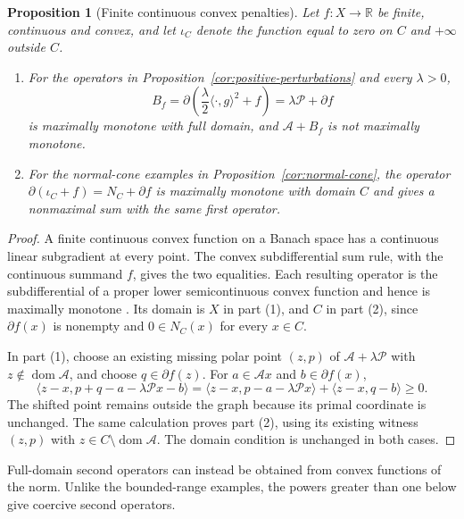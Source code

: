 \documentclass[11pt]{article}
\newcommand{\R}{\mathbb R}
\newcommand{\dom}{\operatorname{dom}}
\newcommand{\pair}[2]{\langle #1,#2\rangle}
\newtheorem{proposition}{Proposition}
\theoremstyle{definition}
\theoremstyle{remark}
\begin{document}
\begin{proposition}[Finite continuous convex penalties]
\label{cor:nonsmooth-penalties}
\label{cor:constrained-penalties}
Let $f:X\to\R$ be finite, continuous and convex, and let $\iota_C$ denote the function equal to zero on $C$ and $+\infty$ outside $C$.
\begin{enumerate}
\item For the operators in Proposition~\ref{cor:positive-perturbations} and every $\lambda>0$,
\[
B_f=\partial\left(\frac\lambda2\pair{\cdot}{g}^2+f\right)=\lambda\mathcal P+\partial f
\]
is maximally monotone with full domain, and $\mathcal A+B_f$ is not maximally monotone.
\item For the normal-cone examples in Proposition~\ref{cor:normal-cone}, the operator $\partial(\iota_C+f)=N_C+\partial f$ is maximally monotone with domain $C$ and gives a nonmaximal sum with the same first operator.
\end{enumerate}
\end{proposition}
\begin{proof}
A finite continuous convex function on a Banach space has a continuous linear subgradient at every point. The convex subdifferential sum rule, with the continuous summand $f$, gives the two equalities. Each resulting operator is the subdifferential of a proper lower semicontinuous convex function and hence is maximally monotone \cite{rockafellar1970subdiff}. Its domain is $X$ in part (1), and $C$ in part (2), since $\partial f(x)$ is nonempty and $0\in N_C(x)$ for every $x\in C$.

In part (1), choose an existing missing polar point $(z,p)$ of $\mathcal A+\lambda\mathcal P$ with $z\notin\dom\mathcal A$, and choose $q\in\partial f(z)$. For $a\in\mathcal A x$ and $b\in\partial f(x)$,
\[
\pair{z-x}{p+q-a-\lambda\mathcal Px-b}
=\pair{z-x}{p-a-\lambda\mathcal Px}+\pair{z-x}{q-b}\ge0.
\]
The shifted point remains outside the graph because its primal coordinate is unchanged. The same calculation proves part (2), using its existing witness $(z,p)$ with $z\in C\setminus\dom\mathcal A$. The domain condition is unchanged in both cases.
\end{proof}

Full-domain second operators can instead be obtained from convex functions of the norm. Unlike the bounded-range examples, the powers greater than one below give coercive second operators.
\end{document}
